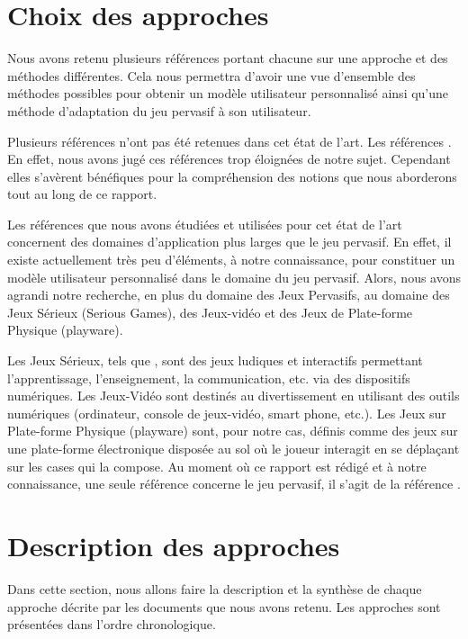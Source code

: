 \documentclass{article}
\begin{document}
\section{Choix des approches}\label{sec:choixapproches}
    Nous avons retenu plusieurs références portant chacune sur une approche et des méthodes différentes. Cela nous permettra d'avoir une vue d'ensemble des méthodes possibles pour obtenir un modèle utilisateur personnalisé ainsi qu'une méthode d'adaptation du jeu pervasif à son utilisateur.\par
    Plusieurs références n'ont pas été retenues dans cet état de l'art. Les références \cite{alhudar_2019,astic_2013,dzedzickis_et_al._2020,kanjo_et_al._2015,saganowski_et_al._2020,schrader_et_al._2017,shu_et_al._2018}. 
    En effet, nous avons jugé ces références trop éloignées de notre sujet. 
    Cependant elles s'avèrent bénéfiques pour la compréhension des notions que nous aborderons tout au long de ce rapport.\par
    Les références que nous avons étudiées et utilisées pour cet état de l’art concernent des domaines d’application plus larges que le jeu pervasif. 
    En effet, il existe actuellement très peu d’éléments, à notre connaissance, pour constituer un modèle utilisateur personnalisé dans le domaine du jeu pervasif. 
    Alors, nous avons agrandi notre recherche, en plus du domaine des Jeux Pervasifs, au domaine des Jeux Sérieux (Serious Games), des Jeux-vidéo et des Jeux de Plate-forme Physique (playware).\par
    Les Jeux Sérieux, tels que  \cite{berthelon_2013,Mostefai_et_al._2019,noor_et_al._2009}, sont des jeux ludiques et interactifs permettant l’apprentissage, l’enseignement, la communication, etc. via des dispositifs numériques. Les Jeux-Vidéo \cite{carofiglio_et_al._2019,gal_et_al._2020,gizycka_et_al._2018,maier_et_al._2019,nalepa_et_al._2017} sont destinés au divertissement en utilisant des outils numériques (ordinateur, console de jeux-vidéo, smart phone, etc.). Les Jeux sur Plate-forme Physique (playware) \cite{yannakakis_et_al._2009} sont, pour notre cas, définis comme des jeux sur une plate-forme électronique disposée au sol où le joueur interagit en se déplaçant sur les cases qui la compose. Au moment où ce rapport est rédigé et à notre connaissance, une seule référence concerne le jeu pervasif, il s’agit de la référence \cite{gal_2019}.

\section{Description des approches}\label{sec:descriptionapp}
    Dans cette section, nous allons faire la description et la synthèse de chaque approche décrite par les documents que nous avons retenu. Les approches sont présentées dans l'ordre chronologique. 
\end{document}
